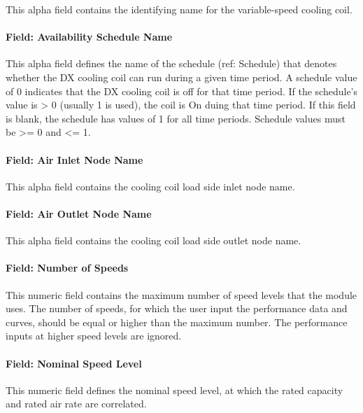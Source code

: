 This alpha field contains the identifying name for the variable-speed cooling coil.

\paragraph{Field: Availability Schedule Name}\label{field-availability-schedule-name-16-001}

This alpha field defines the name of the schedule (ref: Schedule) that denotes whether the DX cooling coil can run during a given time period. A schedule value of 0 indicates that the DX cooling coil is off for that time period. If the schedule's value is \textgreater{} 0 (usually 1 is used), the coil is On duing that time period. If this field is blank, the schedule has values of 1 for all time periods. Schedule values must be \textgreater{}= 0 and \textless{}= 1.

\paragraph{Field: Air Inlet Node Name}\label{field-air-inlet-node-name-12}

This alpha field contains the cooling coil load side inlet node name.

\paragraph{Field: Air Outlet Node Name}\label{field-air-outlet-node-name-12}

This alpha field contains the cooling coil load side outlet node name.

\paragraph{Field: Number of Speeds}\label{field-number-of-speeds-1}

This numeric field contains the maximum number of speed levels that the module uses. The number of speeds, for which the user input the performance data and curves, should be equal or higher than the maximum number. The performance inputs at higher speed levels are ignored.

\paragraph{Field: Nominal Speed Level}\label{field-nominal-speed-level}

This numeric field defines the nominal speed level, at which the rated capacity and rated air rate are correlated.

